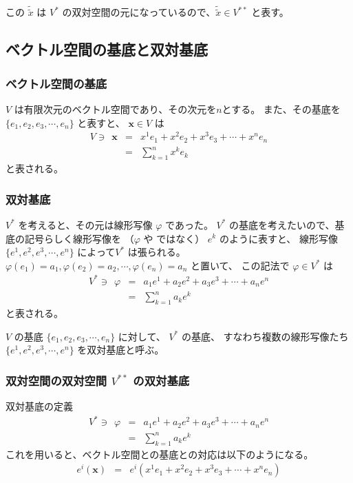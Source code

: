 \documentclass[uplatex,a4j,12pt,dvipdfmx]{jsarticle}
\begin{document}
この $\tilde{\tilde{x}}$ は $V^{*}$ の双対空間の元になっているので、$\tilde{\tilde{x}} \in V^{**}$ と表す。


\subsection{ベクトル空間の基底と双対基底}

\subsubsection{ベクトル空間の基底}

$V$ は有限次元のベクトル空間であり、その次元を$n$とする。
また、その基底を$\{ e_{1}, e_{2}, e_{3}, \cdots , e_{n} \}$
と表すと、
$\mathbf{x} \in V$ は
\[
	\begin{array}{rcl}
		V \ni \ \
		\mathbf{x}
		 & = &
		x^{1} e_{1} + x^{2} e_{2} + x^{3} e_{3} + \cdots + x^{n} e_{n}
		\\
		 & = &
		\displaystyle \sum_{k=1}^{n} x^{k} e_{k}
	\end{array}
\]
と表される。

\subsubsection{双対基底}

$V^{*}$ を考えると、その元は線形写像 $\varphi$ であった。
$V^{*}$ の基底を考えたいので、基底の記号らしく線形写像を （$\varphi$ や ではなく） $e^{k}$ のように表すと、
線形写像$\{ e^{1}, e^{2}, e^{3}, \cdots , e^{n} \}$ によって$V^{*}$ は張られる。
$\varphi(e_{1}) = a_{1}, \varphi(e_{2}) = a_{2}, \cdots ,\varphi(e_{n}) = a_{n}$ と置いて、
この記法で
$\varphi \in V^{*}$ は
\[
	\begin{array}{rcl}
		V^{*} \ni \ \ \varphi
		 & = &
		a_{1} e^{1} + a_{2} e^{2} + a_{3} e^{3} + \cdots + a_{n} e^{n}
		\\
		 & = &
		\displaystyle \sum_{k=1}^{n} a_{k} e^{k}
	\end{array}
\]
と表される。

$V$ の基底
$\{ e_{1}, e_{2}, e_{3}, \cdots , e_{n} \}$
に対して、
$V^{*}$ の基底、
すなわち複数の線形写像たち
$\{ e^{1}, e^{2}, e^{3}, \cdots , e^{n} \}$
を双対基底と呼ぶ。

\subsubsection{双対空間の双対空間 $V^{**}$ の双対基底}

双対基底の定義
\[
	\begin{array}{rcl}
		V^{*} \ni \ \ \varphi
		 & = &
		a_{1} e^{1} + a_{2} e^{2} + a_{3} e^{3} + \cdots + a_{n} e^{n}
		\\
		 & = &
		\displaystyle \sum_{k=1}^{n} a_{k} e^{k}
	\end{array}
\]
これを用いると、ベクトル空間との基底との対応は以下のようになる。
\[
	\begin{array}{rcl}
		e^{i}(\mathbf{x})
		 & = &
		e^{i} (x^{1} e_{1} + x^{2} e_{2} + x^{3} e_{3} + \cdots + x^{n} e_{n})
	\end{array}
\]
\end{document}
